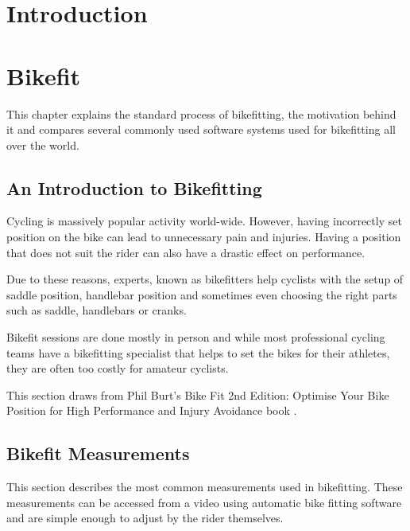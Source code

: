 
% 

\chapter{Introduction}



\chapter{Bikefit}
This chapter explains the standard process of bikefitting, the motivation behind it and compares several commonly used software systems used for bikefitting all over the world.

\section{An Introduction to Bikefitting}
Cycling is massively popular activity world-wide. However, having incorrectly set position on the bike can lead to unnecessary pain and injuries. Having a position that does not suit the rider can also have a drastic effect on performance.

Due to these reasons, experts, known as bikefitters help cyclists with the setup of saddle position, handlebar position and sometimes even choosing the right parts such as saddle, handlebars or cranks.

Bikefit sessions are done mostly in person and while most professional cycling teams have a bikefitting specialist that helps to set the bikes for their athletes, they are often too costly for amateur cyclists.


This section draws from Phil Burt's Bike Fit 2nd Edition: Optimise Your Bike Position for High Performance and Injury Avoidance book \cite{burtbikefit}.

\section{Bikefit Measurements}
This section describes the most common measurements used in bikefitting. These measurements can be accessed from a video using automatic bike fitting software and are simple enough to adjust by the rider themselves.

